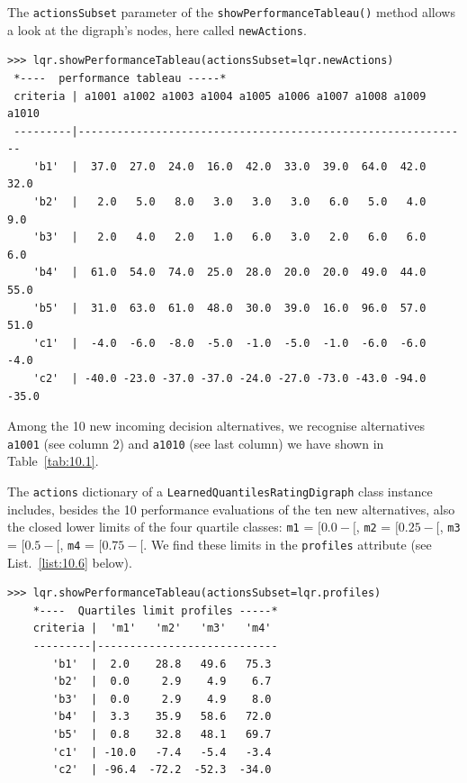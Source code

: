 The \texttt{actionsSubset} parameter of the \texttt{showPerformanceTableau()} method allows a look at the digraph's nodes, here called \texttt{newActions}.
\begin{lstlisting}[caption={Performance tableau of the new incoming decision alternatives},label=list:10.5,basicstyle=\ttfamily\scriptsize]
>>> lqr.showPerformanceTableau(actionsSubset=lqr.newActions)
 *----  performance tableau -----*
 criteria | a1001 a1002 a1003 a1004 a1005 a1006 a1007 a1008 a1009 a1010   
 ---------|-------------------------------------------------------------
    'b1'  |  37.0  27.0  24.0  16.0  42.0  33.0  39.0  64.0  42.0  32.0  
    'b2'  |   2.0   5.0   8.0   3.0   3.0   3.0   6.0   5.0   4.0   9.0  
    'b3'  |   2.0   4.0   2.0   1.0   6.0   3.0   2.0   6.0   6.0   6.0  
    'b4'  |  61.0  54.0  74.0  25.0  28.0  20.0  20.0  49.0  44.0  55.0  
    'b5'  |  31.0  63.0  61.0  48.0  30.0  39.0  16.0  96.0  57.0  51.0  
    'c1'  |  -4.0  -6.0  -8.0  -5.0  -1.0  -5.0  -1.0  -6.0  -6.0  -4.0  
    'c2'  | -40.0 -23.0 -37.0 -37.0 -24.0 -27.0 -73.0 -43.0 -94.0 -35.0  
\end{lstlisting}

Among the 10 new incoming decision alternatives, we recognise alternatives \texttt{a1001} (see column 2) and \texttt{a1010} (see last column) we have shown in Table~\vref{tab:10.1}.

The \texttt{actions} dictionary of a \texttt{LearnedQuantilesRatingDigraph} class instance includes, besides the 10 performance evaluations of the ten new alternatives, also the closed lower limits of the four quartile classes: \texttt{m1} = $[0.0- [$, \texttt{m2} = $[0.25- [$, \texttt{m3} = $[0.5- [$, \texttt{m4} = $[0.75 - [$. We find these limits in the \texttt{profiles} attribute (see List.~\vref{list:10.6} below).
\begin{lstlisting}[caption={Showing the limiting profiles of the rating quantiles},label=list:10.6]
>>> lqr.showPerformanceTableau(actionsSubset=lqr.profiles)
    *----  Quartiles limit profiles -----*
    criteria |  'm1'   'm2'   'm3'   'm4'   
    ---------|----------------------------
       'b1'  |  2.0    28.8   49.6   75.3  
       'b2'  |  0.0     2.9    4.9    6.7  
       'b3'  |  0.0     2.9    4.9    8.0  
       'b4'  |  3.3    35.9   58.6   72.0  
       'b5'  |  0.8    32.8   48.1   69.7  
       'c1'  | -10.0   -7.4   -5.4   -3.4  
       'c2'  | -96.4  -72.2  -52.3  -34.0  
\end{lstlisting}

